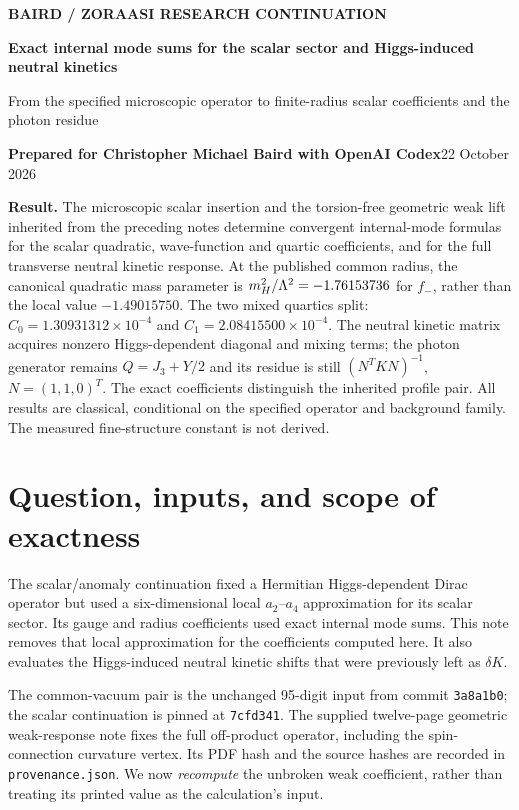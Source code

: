 \documentclass[11pt,letterpaper]{article}
\begin{document}
\thispagestyle{plain}
{\small\bfseries\color{teal} BAIRD / ZORAASI RESEARCH CONTINUATION}\par
{\LARGE\bfseries\color{navy} Exact internal mode sums for the scalar sector and Higgs-induced neutral kinetics}\par
{\large From the specified microscopic operator to finite-radius scalar coefficients and the photon residue}\par
\textbf{Prepared for Christopher Michael Baird with OpenAI Codex}\hfill 22 October 2026

\colorbox{pale}{\parbox{\dimexpr\linewidth-2\fboxsep\relax}{\textbf{Result.} The microscopic scalar insertion and the torsion-free geometric weak lift inherited from the preceding notes determine convergent internal-mode formulas for the scalar quadratic, wave-function and quartic coefficients, and for the full transverse neutral kinetic response. At the published common radius, the canonical quadratic mass parameter is $m_H^2/\Lambda^2=-1.76153736$ for $f_-$, rather than the local value $-1.49015750$. The two mixed quartics split: $C_0=1.30931312\times10^{-4}$ and $C_1=2.08415500\times10^{-4}$. The neutral kinetic matrix acquires nonzero Higgs-dependent diagonal and mixing terms; the photon generator remains $Q=J_3+Y/2$ and its residue is still $(N^TKN)^{-1}$, $N=(1,1,0)^T$. The exact coefficients distinguish the inherited profile pair. All results are classical, conditional on the specified operator and background family. The measured fine-structure constant is not derived.}}

\section{Question, inputs, and scope of exactness}

The scalar/anomaly continuation \cite{scalar} fixed a Hermitian Higgs-dependent Dirac operator but used a six-dimensional local $a_2$--$a_4$ approximation for its scalar sector. Its gauge and radius coefficients used exact internal mode sums. This note removes that local approximation for the coefficients computed here. It also evaluates the Higgs-induced neutral kinetic shifts that were previously left as $\delta K$.

The common-vacuum pair is the unchanged 95-digit input from commit \texttt{3a8a1b0}; the scalar continuation is pinned at \texttt{7cfd341}. The supplied twelve-page geometric weak-response note \cite{weak} fixes the full off-product operator, including the spin-connection curvature vertex. Its PDF hash and the source hashes are recorded in \texttt{provenance.json}. We now \emph{recompute} the unbroken weak coefficient, rather than treating its printed value as the calculation's input.
\end{document}
